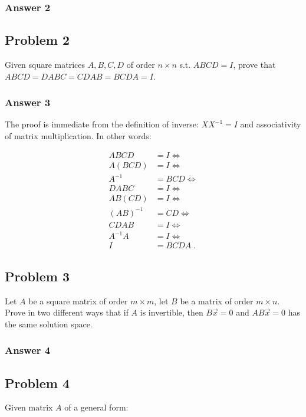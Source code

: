 \documentclass[11pt]{article}
\begin{document}
\subsubsection{Answer 2}
\label{sec:orgheadline2}

\subsection{Problem 2}
\label{sec:orgheadline5}
Given square matrices \(A, B, C, D\) of order \(n \times n\) s.t. \(ABCD = I\),
prove that \(ABCD = DABC = CDAB = BCDA = I\).

\subsubsection{Answer 3}
\label{sec:orgheadline4}
The proof is immediate from the definition of inverse: \(XX^{-1} = I\) and
associativity of matrix multiplication.  In other words:

\begin{align*}
  ABCD &= I \iff \\
  A(BCD) &= I \iff \\
  A^{-1} &= BCD \iff \\
  DABC &= I \iff \\
  AB(CD) &= I \iff \\
  (AB)^{-1} &= CD \iff \\
  CDAB &= I \iff \\
  A^{-1}A &= I \iff \\
  I &= BCDA \;.
\end{align*}

\subsection{Problem 3}
\label{sec:orgheadline7}
Let \(A\) be a square matrix of order \(m \times m\), let \(B\) be a matrix of
order \(m \times n\).  Prove in two different ways that if \(A\) is invertible,
then \(B\vec{x} = 0\) and \(AB\vec{x} = 0\) has the same solution space.

\subsubsection{Answer 4}
\label{sec:orgheadline6}

\subsection{Problem 4}
\label{sec:orgheadline9}
Given matrix \(A\) of a general form:
\end{document}
